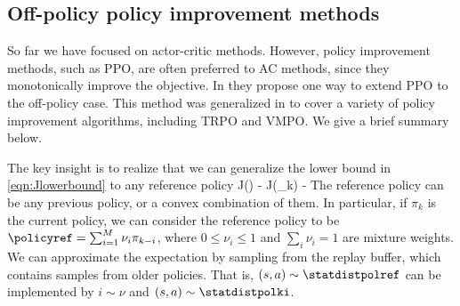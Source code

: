 




\subsection{Off-policy policy improvement methods}
\label{sec:offpolPolImprovement}

So far we have focused on  actor-critic methods.
However, policy improvement methods, such as PPO,
are often preferred to AC methods,
since they monotonically improve the objective.
In  \citep{Queeney2021} they propose
one way to extend PPO to the off-policy case.
This method was generalized in  \cite{Queeney2024}
to cover a variety of policy improvement algorithms,
including TRPO and VMPO.
We give a brief summary below.

The key insight is to realize that we can generalize
the lower bound in \cref{eqn:Jlowerbound}
to any reference policy 
\be
J(\pi) - J(\pi_k)
\geq
-
  \ee
The reference policy can be any previous policy,
or a convex combination of them.
In particular, if $\pi_k$ is the current policy,
we can consider the reference policy to be
$\policyref = \sum_{i=1}^M \nu_i \pi_{k-i}$,
where $0 \leq \nu_i \leq 1$
and $\sum_i \nu_i = 1$ are mixture weights.
We can approximate the expectation
by sampling  from the  replay buffer,
which contains samples from older policies.
That is, $(s,a) \sim \statdistpolref$
can be implemented by $i \sim \nu$
and $(s,a) \sim \statdistpolki$.

